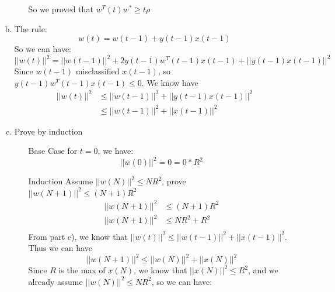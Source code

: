 \documentclass{article}
\def\math#1{$#1$}
\begin{document}
\begin{enumerate}[a)]
\begin{itemize}
            So we proved that \math{w^T(t) w^* \geq t\rho}
        \end{itemize}
    \item The rule: 
        \begin{equation}
            w(t) = w(t - 1) + y(t - 1)x(t - 1)
        \end{equation}
        So we can have:
        \begin{equation}
                ||w(t)||^2 = ||w(t - 1)||^2 + 2y(t - 1) w^T(t - 1)x(t - 1) + ||y(t - 1)x(t - 1)||^2
        \end{equation}
        Since \math{w(t - 1)} misclassified \math{x(t - 1)}, so \math{y(t - 1)w^T(t - 1)x(t - 1) \leq 0}. We know have
        \begin{equation}
            \begin{split}
                ||w(t)||^2 &\leq ||w(t - 1)||^2 + ||y(t - 1)x(t - 1)||^2 \\
                &\leq ||w(t - 1)||^2 + ||x(t - 1)||^2
            \end{split}
        \end{equation}
    \item Prove by induction
        \begin{itemize}
            \item [Base Case] for \math{t = 0}, we have:
                \begin{equation}
                    ||w(0)||^2 = 0 = 0 * R^2
                \end{equation}
            \item [Induction] Assume \math{||w(N)||^2 \leq NR^2}, prove \math{||w(N + 1)||^2 \leq (N + 1)R^2}
            \begin{equation}
                \begin{split}
                    ||w(N + 1)||^2 & \leq (N + 1)R^2 \\
                    ||w(N + 1)||^2 &\leq NR^2 + R^2 \\
                \end{split}
            \end{equation}
            From part c), we know that \math{||w(t)||^2 \leq ||w(t - 1)||^2 + ||x(t - 1)||^2}. Thus we can have 
            \begin{equation}
                ||w(N + 1)||^2 \leq ||w(N)||^2 + ||x(N)||^2
            \end{equation}
            Since \math{R} is the max of \math{x(N)}, we know that \math{||x(N)||^2 \leq R^2}, and we already assume \math{||w(N)||^2 \leq NR^2}, so we can have:

\end{itemize}
\end{enumerate}
\end{document}
